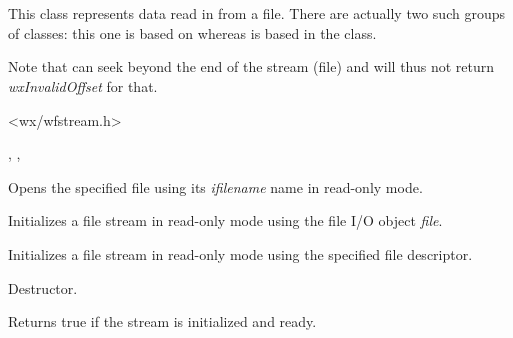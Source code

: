 \section{}\label{wxfileinputstream}

This class represents data read in from a file. There are actually
two such groups of classes: this one is based on  
whereas  is based in
the  class.

Note that  
can seek beyond the end of the stream (file) and will thus not return 
{\it wxInvalidOffset} for that.




<wx/wfstream.h>


, , 


\label{wxfileinputstreamctor}


Opens the specified file using its {\it ifilename} name in read-only mode.


Initializes a file stream in read-only mode using the file I/O object {\it file}.


Initializes a file stream in read-only mode using the specified file descriptor.

\label{wxfileinputstreamdtor}


Destructor.

\label{wxfileinputstreamok}


Returns true if the stream is initialized and ready.

